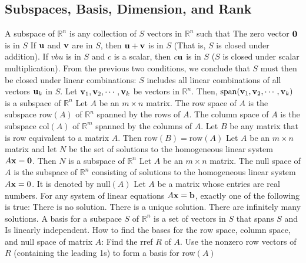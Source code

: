 \documentclass{article}
\begin{document}
       \subsection{Subspaces, Basis, Dimension, and Rank}
       \begin{outline}
            \1 A subspace of \(\mathbb R^n\) is any collection of $S$ vectors in \(\mathbb R^n\) such that 
                \2 The zero vector \(\vb 0\) is in $S$
                \2 If \(\vb u\) and \(\vb v\) are in $S$, then \(\vb u+\vb v\) is in $S$ (That is, $S$ is closed under addition). 
                \2 If \(vb u\) is in $S$ and $c$ is a scalar, then \(c\vb u\) is in $S$ ($S$ is closed under scalar multiplication). 
                \2 From the previous two conditions, we conclude that $S$ must then be closed under linear combinations: $S$ includes all linear combinations of all vectors \(\vb u_k\) in $S$. 
            \1 Let \(\vb v_1,\vb v_2,\cdots,\vb v_k\) be vectors in \(\mathbb R^n\). Then, \(\text{span}(\vb v_1,\vb v_2,\cdots,\vb v_k)\) is a subspace of \(\mathbb R^n\)
            \1 Let \(A\) be an \(m\times n\) matrix. 
                \2 The row space of $A$ is the subspace row\((A)\) of \(\mathbb R^n\) spanned by the rows of \(A\). 
                \2 The column space of \(A\) is the subspace col\((A)\) of \(\mathbb R^m\) spanned by the columns of \(A\). 
            \1 Let \(B\) be any matrix that is row equivalent to a matrix \(A\). Then \(\text{row}(B)=\text{row}(A)\)
            \1 Let \(A\) be an \(m\times n\) matrix and let \(N\) be the set of solutions to the homogeneous linear system \(A\vb x=\vb 0\). Then \(N\) is a subspace of \(\mathbb R^n\)
            \1 Let \(A\) be an \(m\times n\) matrix. The null space of \(A\) is the subspace of \(\mathbb R^n\) consisting of solutions to the homogeneous linear system \(A\vb x=0\). It is denoted by \(\text{null}(A)\)
            \1 Let \(A\) be a matrix whose entries are real numbers. For any system of linear equations \(A\vb x=\vb b\), exactly one of the following is true: 
                \2 There is no solution. 
                \2 There is a unique solution. 
                \2 There are infinitely many solutions. 
            \1 A basis for a subspace $S$ of \(\mathbb R^n\) is a set of vectors in $S$ that 
                \2 spans $S$ and 
                \2 Is linearly independent. 
            \1 How to find the bases for the row space, column space, and null space of matrix \(A\):
                \2 Find the rref $R$ of $A$. 
                \2 Use the nonzero row vectors of $R$ (containing the leading 1s) to form a basis for row\((A)\)

\end{outline}
\end{document}

